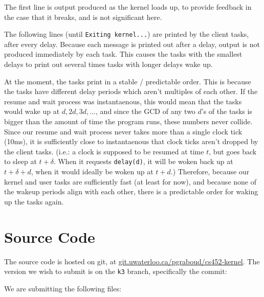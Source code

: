 \documentclass[titlepage]{article}
\begin{document}
The first line is output produced as the kernel loads up, to provide feedback in the case that it breaks,
and is not significant here.

The following lines (until \texttt{Exiting kernel...}) are printed by the client tasks, after every delay.
Because each message is printed out after a delay, output is not produced immediately by each task.
This causes the tasks with the smallest delays to print out several times tasks with longer delays wake up.

At the moment, the tasks print in a stable / predictable order.
This is because the tasks have different delay periods which aren't multiples of each other.
If the resume and wait process was instantaenous, this would mean that the tasks would wake up at $d, 2d, 3d, \ldots$,
and since the GCD of any two $d$'s of the tasks is bigger than the amount of time the program runs, these
numbers never collide.
Since our resume and wait process never takes more than a single clock tick (10ms), it is sufficiently close to instantaenous
that clock ticks aren't dropped by the client tasks.
(i.e.: a clock is supposed to be resumed at time $t$, but goes back to sleep at $t + \delta$.
When it requests \texttt{delay(d)}, it will be woken back up at $t + \delta + d$, when it would ideally
be woken up at $t + d$.)
Therefore, because our kernel and user tasks are sufficiently fast (at least for now), and because
none of the wakeup periods align with each other, there is a predictable order for waking up the tasks again.

\section{Source Code}
The source code is hosted on git, at \url{git.uwaterloo.ca/pgraboud/cs452-kernel}.
The version we wish to submit is on the \texttt{k3} branch, specifically
the commit:

We are submitting the following files:


\end{document}
